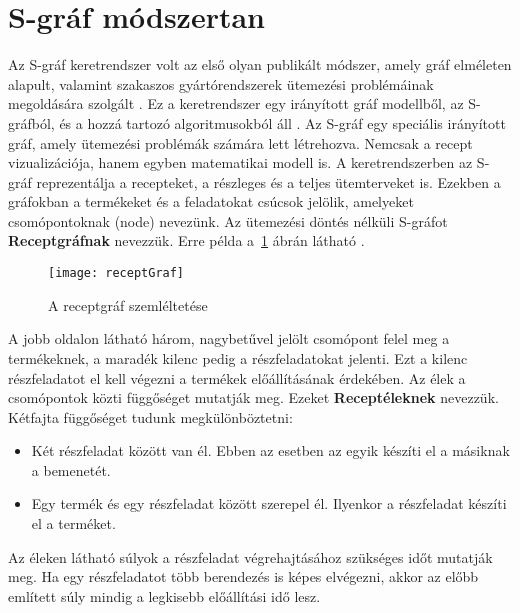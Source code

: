 \section{S-gráf módszertan}
Az S-gráf keretrendszer volt az első olyan publikált módszer, amely gráf elméleten alapult, valamint szakaszos gyártórendszerek ütemezési problémáinak megoldására szolgált \cite{combtech}. Ez a keretrendszer egy irányított gráf modellből, az S-gráfból, és a hozzá tartozó algoritmusokból áll \cite{combframe}. Az S-gráf egy speciális irányított gráf, amely ütemezési problémák számára lett létrehozva. Nemcsak a recept vizualizációja, hanem egyben matematikai modell is. A keretrendszerben az S-gráf reprezentálja a recepteket, a részleges és a teljes ütemterveket is. Ezekben a gráfokban a termékeket és a feladatokat csúcsok jelölik, amelyeket csomópontoknak (node) nevezünk. Az ütemezési döntés nélküli S-gráfot \textbf{Receptgráfnak} nevezzük. Erre példa a~\ref{receptGraf} ábrán látható \cite{Hegyhati}. 
\begin{figure}[H]	
\begin{center}
\texttt{[image: receptGraf]}
\caption{A receptgráf szemléltetése}
\label{receptGraf}
\end{center}
\end{figure}
A jobb oldalon látható három, nagybetűvel jelölt csomópont felel meg a termékeknek, a maradék kilenc pedig a részfeladatokat jelenti. Ezt a kilenc részfeladatot el kell végezni a termékek előállításának érdekében. Az élek a csomópontok közti függőséget mutatják meg. Ezeket \textbf{Receptéleknek} nevezzük. Kétfajta függőséget tudunk megkülönböztetni:
\begin{itemize}
  \item Két részfeladat között van él. Ebben az esetben az egyik készíti el a másiknak a bemenetét.
  \item Egy termék és egy részfeladat között szerepel él. Ilyenkor a részfeladat készíti el a terméket.
\end{itemize}
Az éleken látható súlyok a részfeladat végrehajtásához szükséges időt mutatják meg. Ha egy részfeladatot több berendezés is képes elvégezni, akkor az előbb említett súly mindig a legkisebb előállítási idő lesz.

